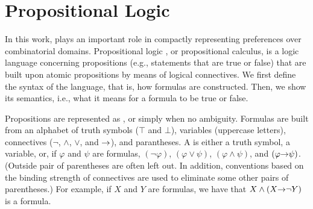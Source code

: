 \section{Propositional Logic}
In this work,  plays an important role in compactly representing
preferences over combinatorial domains.
Propositional logic \cite{heindiscrete}, or propositional calculus, is a logic language concerning
propositions (e.g., statements that are true or false) that are built upon atomic propositions
by means of logical connectives.
We first define the syntax of the language, that is, how formulas are constructed.
Then, we show its semantics, i.e., what it means for a formula to be true or false.

Propositions are represented as , or simply  when no ambiguity.
Formulas are built from an alphabet of truth symbols ($\top$ and $\bot$),
variables (uppercase letters), connectives ($\neg$, $\land$, $\lor$, and $\mathit{\rightarrow}$), and parantheses.
A  is either a truth symbol, a variable, or, if $\varphi$ and $\psi$ are formulas,
$(\neg \varphi)$, $(\varphi \lor \psi)$, $(\varphi \land \psi)$, and
$(\varphi \mathit{\rightarrow} \psi)$. (Outside pair of parentheses are often left out.
In addition, conventions based on the binding strength of connectives
are used to eliminate some other pairs of parentheses.)
For example, if $X$ and $Y$ are formulas, we have that $X \land (X \mathit{\rightarrow} \neg Y)$ is a formula.

%

